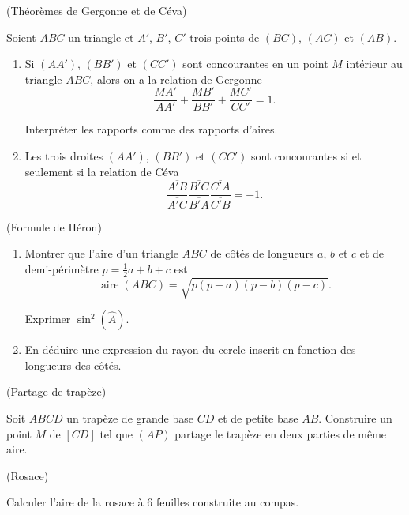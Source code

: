 \documentclass[a4paper,11pt,reqno]{amsart}
\DeclareMathOperator{\aire}{aire}
\begin{document}
\begin{exo} (Théorèmes de Gergonne et de Céva)

  Soient $ABC$ un triangle et $A'$, $B'$, $C'$ trois points de $(BC)$, $(AC)$ et $(AB)$.
  \begin{enumerate}
    \item Si $(AA')$, $(BB')$ et $(CC')$ sont concourantes en un point $M$ intérieur au triangle $ABC$, alors on a la relation de Gergonne
    $$
      \frac{MA'}{AA'}+\frac{MB'}{BB'}+\frac{MC'}{CC'}=1.
    $$
    \begin{indication}
      Interpréter les rapports comme des rapports d'aires.
    \end{indication}
    \item Les trois droites $(AA')$, $(BB')$ et $(CC')$ sont concourantes si et seulement si la relation de Céva
      $$
        \frac{\overline{A'B}}{\overline{A'C}}\frac{\overline{B'C}}{\overline{B'A}}\frac{\overline{C'A}}{\overline{C'B}}=-1.
      $$
  \end{enumerate}
\end{exo}

\begin{exo} (Formule de Héron)

  \begin{enumerate}
    \item Montrer que l'aire d'un triangle $ABC$ de côtés de longueurs $a$, $b$ et $c$ et de demi-périmètre $p=\frac{1}{2}{a+b+c}$ est
    $$
      \aire{(ABC)}=\sqrt{p(p-a)(p-b)(p-c)}.
    $$
    \begin{indication}
      Exprimer $\sin^2(\widehat{A})$.
    \end{indication}
    \item En déduire une expression du rayon du cercle inscrit en fonction des longueurs des côtés.
  \end{enumerate}
\end{exo}

\begin{exo} (Partage de trapèze)

  Soit $ABCD$ un trapèze de grande base $CD$ et de petite base $AB$. Construire un point $M$ de $[CD]$ tel que $(AP)$ partage le trapèze en deux parties de même aire.
\end{exo}

\begin{exo} (Rosace)

  Calculer l'aire de la rosace à 6 feuilles construite au compas.
\end{exo}
\end{document}

